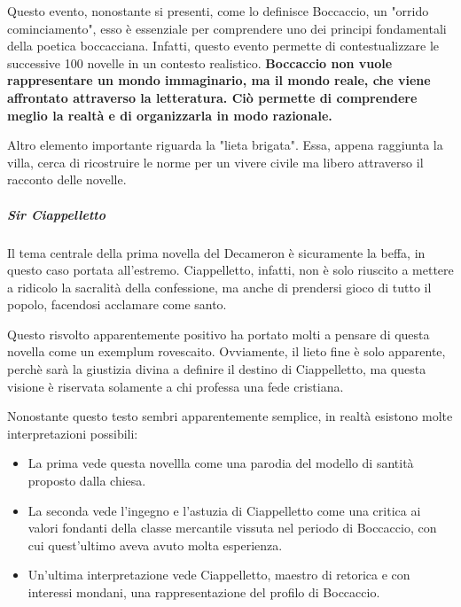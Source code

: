 \documentclass[10pt,a4paper]{article}
\begin{document}
Questo evento, nonostante si presenti, come lo definisce Boccaccio, un "orrido cominciamento", esso è essenziale per comprendere uno dei principi fondamentali della poetica boccacciana. Infatti, questo evento permette di contestualizzare le successive 100 novelle in un contesto realistico. \textbf{Boccaccio non vuole rappresentare un mondo immaginario, ma il mondo reale, che viene affrontato attraverso la letteratura. Ciò permette di comprendere meglio la realtà e di organizzarla in modo razionale.}

Altro elemento importante riguarda la "lieta brigata". Essa, appena raggiunta la villa, cerca di ricostruire le norme per un vivere civile ma libero attraverso il racconto delle novelle.

\subparagraph{Sir Ciappelletto}

Il tema centrale della prima novella del Decameron è sicuramente la beffa, in questo caso portata all'estremo. Ciappelletto, infatti, non è solo riuscito a mettere a ridicolo la sacralità della confessione, ma anche di prendersi gioco di tutto il popolo, facendosi acclamare come santo.

Questo risvolto apparentemente positivo ha portato molti a pensare di questa novella come un exemplum rovescaito. Ovviamente, il lieto fine è solo apparente, perchè sarà la giustizia divina a definire il destino di Ciappelletto, ma questa visione è riservata solamente a chi professa una fede cristiana.

Nonostante questo testo sembri apparentemente semplice, in realtà esistono molte interpretazioni possibili:
\begin{itemize}
	\item La prima vede questa novellla come una parodia del modello di santità proposto dalla chiesa.
	\item La seconda vede l'ingegno e l'astuzia di Ciappelletto come una critica ai valori fondanti della classe mercantile vissuta nel periodo di Boccaccio, con cui quest'ultimo aveva avuto molta esperienza.
	\item Un'ultima interpretazione vede Ciappelletto, maestro di retorica e con interessi mondani, una rappresentazione del profilo di Boccaccio.
\end{itemize}
\end{document}
